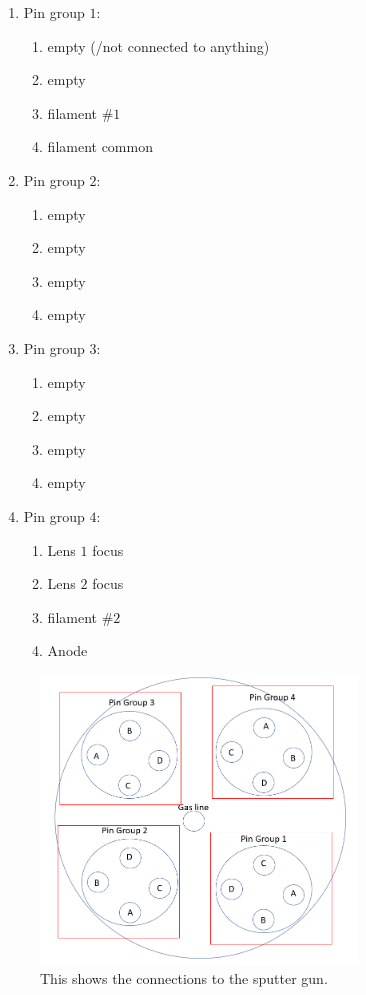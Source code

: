 \documentclass[11pt,a4paper]{report}
\begin{document}
\begin{enumerate}
	\item  Pin group $1$:
       \begin{enumerate}
                 \item empty (/not connected to anything) 
                 \item  empty
                 \item filament $\# 1$ 
                 \item filament common 
       \end{enumerate}
	\item Pin group $2$:
       \begin{enumerate}
                 \item empty 
                 \item  empty
                 \item empty 
                 \item empty 
       \end{enumerate}
	\item  Pin group $3$:
       \begin{enumerate}
                 \item empty 
                 \item  empty
                 \item empty 
                 \item empty 
       \end{enumerate}
           \item  Pin group $4$: 
      \begin{enumerate}
                 \item Lens $1$ focus 
                 \item  Lens $2$ focus
                 \item filament $\# 2$ 
                 \item Anode
       \end{enumerate}
\end{enumerate}

\begin{figure}[H]
\includegraphics[width=0.75\textwidth]{sputter_gun_connections.png}
\caption{This shows the connections to the sputter gun. }
\label{sputtgun}
\end{figure}
\end{document}
